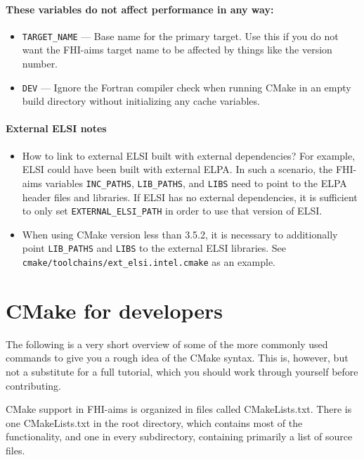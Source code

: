 \paragraph{These variables do not affect performance in any way:}
\begin{itemize}
\item \texttt{TARGET\_NAME} --- Base name for the primary target. Use this if you do not want the FHI-aims target name to be affected by things like the version number.
\item \texttt{DEV} --- Ignore the Fortran compiler check when running CMake in an empty build directory without initializing any cache variables.
\end{itemize}

\paragraph{External ELSI notes}

\begin{itemize}
\item How to link to external ELSI built with external dependencies? For example, ELSI could have been built with external ELPA. In such a scenario, the FHI-aims variables \texttt{INC\_PATHS}, \texttt{LIB\_PATHS}, and \texttt{LIBS} need to point to the ELPA header files and libraries. If ELSI has no external dependencies, it is sufficient to only set \texttt{EXTERNAL\_ELSI\_PATH} in order to use that version of ELSI.
\item When using CMake version less than 3.5.2, it is necessary to additionally point \texttt{LIB\_PATHS} and \texttt{LIBS} to the external ELSI libraries. See \\
  \texttt{cmake/toolchains/ext\_elsi.intel.cmake} as an example.
\end{itemize}

\section{CMake for developers}

The following is a very short overview of some of the more commonly used commands to give you a rough idea of the CMake syntax. This is, however, but not a substitute for a full tutorial, which you should work through yourself before contributing.

CMake support in FHI-aims is organized in files called CMakeLists.txt. There is one CMakeLists.txt in the root directory, which contains most of the functionality, and one in every subdirectory, containing primarily a list of source files.

